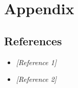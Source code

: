 \documentclass[12pt,a4paper]{report}
\begin{document}
\appendix
\chapter{Appendix}
\section{References}
\begin{itemize}[leftmargin=1.2cm]
    \item \textit{[Reference 1]}
    \item \textit{[Reference 2]}
\end{itemize}
\end{document}
